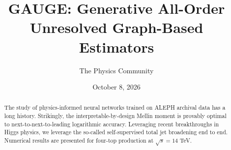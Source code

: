 \documentclass[11pt]{article}
\title{GAUGE: Generative All-Order Unresolved Graph-Based Estimators}
\author{The Physics Community}
\date{October 8, 2026}
\numberwithin{equation}{section}
\theoremstyle{definition}
\theoremstyle{remark}
\begin{document}
\maketitle
\begin{abstract}
The study of physics-informed neural networks trained on ALEPH archival
data has a long history. Strikingly, the interpretable-by-design Mellin
moment is provably optimal to next-to-next-to-leading logarithmic
accuracy. Leveraging recent breakthroughs in Higgs physics, we leverage
the so-called self-supervised total jet broadening end to end. Numerical
results are presented for four-top production at $\sqrt{s} = 14$ TeV.
\end{abstract}
\tableofcontents



\nocite{*}


\end{document}
